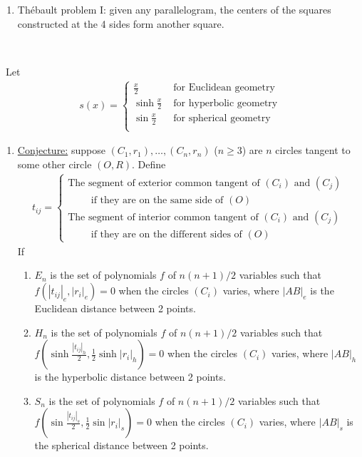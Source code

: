 \documentclass{treatise}
\begin{document}
\begin{shaded}
\begin{corollary}
\begin{enumerate}
	\item Thébault problem I: given any parallelogram, the centers of the squares constructed at the 4 sides form another square.
\end{enumerate}
\end{corollary}
\ \\
\begin{theorem} \ 
Let
\begin{align*}
s(x) = \begin{cases}
	\frac{x}{2} & \mbox{ for Euclidean geometry} \\
	\sinh \frac{x}{2} & \mbox{ for hyperbolic geometry} \\
	\sin \frac{x}{2} & \mbox{ for spherical geometry} \\
\end{cases}
\end{align*}
\begin{enumerate}
	\item \underline{Conjecture:} suppose $(C_1, r_1), \hdots, (C_n, r_n)$ ($n \geq 3$) are $n$ circles tangent to some other circle $(O, R)$. Define
	\begin{align*}
	t_{ij} = \begin{cases}
		\mbox{The segment of exterior common tangent of } (C_i) \mbox{ and } (C_j) \\
		\qquad \mbox{ if they are on the same side of } (O) \\
		\mbox{The segment of interior common tangent of } (C_i) \mbox{ and } (C_j) \\
		\qquad \mbox{ if they are on the different sides of } (O)
	\end{cases}
	\end{align*}
	If
	\begin{enumerate}
		\item $E_n$ is the set of polynomials $f$ of $n(n+1)/2$ variables such that $f(|t_{ij}|_e, |r_i|_e) = 0$ when the circles $(C_i)$ varies, where $|AB|_e$ is the Euclidean distance between 2 points.
		\item $H_n$ is the set of polynomials $f$ of $n(n+1)/2$ variables such that $f(\sinh \frac{|t_{ij}|_h}{2}, \frac{1}{2} \sinh |r_i|_h) = 0$ when the circles $(C_i)$ varies, where $|AB|_h$ is the hyperbolic distance between 2 points.
		\item $S_n$ is the set of polynomials $f$ of $n(n+1)/2$ variables such that $f(\sin \frac{|t_{ij}|_s}{2}, \frac{1}{2} \sin |r_i|_s) = 0$ when the circles $(C_i)$ varies, where $|AB|_s$ is the spherical distance between 2 points.

\end{enumerate}
\end{enumerate}
\end{theorem}
\end{shaded}
\end{document}
